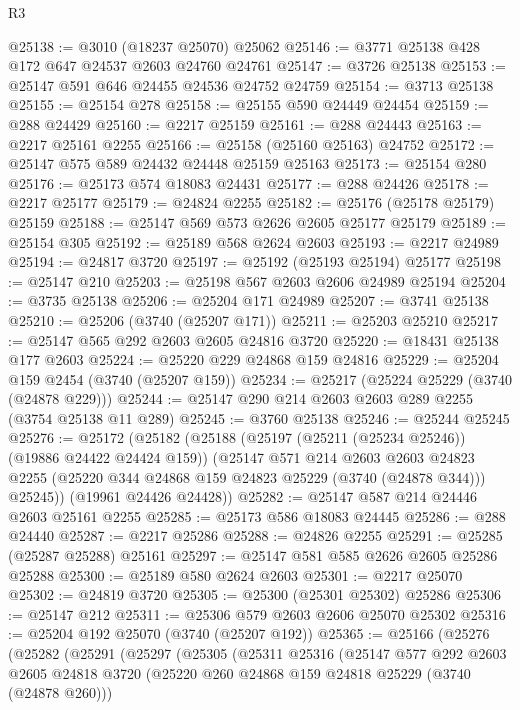 \begin{lexlean}{R3}
\begin{coremodule}
@25138 := @3010 (@18237 @25070) @25062
@25146 := @3771 @25138 @428 @172 @647 @24537 @2603 @24760 @24761
@25147 := @3726 @25138
@25153 := @25147 @591 @646 @24455 @24536 @24752 @24759
@25154 := @3713 @25138
@25155 := @25154 @278
@25158 := @25155 @590 @24449 @24454
@25159 := @288 @24429
@25160 := @2217 @25159
@25161 := @288 @24443
@25163 := @2217 @25161 @2255
@25166 := @25158 (@25160 @25163) @24752
@25172 := @25147 @575 @589 @24432 @24448 @25159 @25163
@25173 := @25154 @280
@25176 := @25173 @574 @18083 @24431
@25177 := @288 @24426
@25178 := @2217 @25177
@25179 := @24824 @2255
@25182 := @25176 (@25178 @25179) @25159
@25188 := @25147 @569 @573 @2626 @2605 @25177 @25179
@25189 := @25154 @305
@25192 := @25189 @568 @2624 @2603
@25193 := @2217 @24989
@25194 := @24817 @3720
@25197 := @25192 (@25193 @25194) @25177
@25198 := @25147 @210
@25203 := @25198 @567 @2603 @2606 @24989 @25194
@25204 := @3735 @25138
@25206 := @25204 @171 @24989
@25207 := @3741 @25138
@25210 := @25206 (@3740 (@25207 @171))
@25211 := @25203 @25210
@25217 := @25147 @565 @292 @2603 @2605 @24816 @3720
@25220 := @18431 @25138 @177 @2603
@25224 := @25220 @229 @24868 @159 @24816
@25229 := @25204 @159 @2454 (@3740 (@25207 @159))
@25234 := @25217 (@25224 @25229 (@3740 (@24878 @229)))
@25244 := @25147 @290 @214 @2603 @2603 @289 @2255 (@3754 @25138 @11 @289)
@25245 := @3760 @25138
@25246 := @25244 @25245
@25276 := @25172
    (@25182
      (@25188
        (@25197 (@25211 (@25234 @25246)) (@19886 @24422 @24424 @159))
        (@25147
          @571
          @214
          @2603
          @2603
          @24823
          @2255
          (@25220 @344 @24868 @159 @24823 @25229 (@3740 (@24878 @344)))
          @25245))
      (@19961 @24426 @24428))
@25282 := @25147 @587 @214 @24446 @2603 @25161 @2255
@25285 := @25173 @586 @18083 @24445
@25286 := @288 @24440
@25287 := @2217 @25286
@25288 := @24826 @2255
@25291 := @25285 (@25287 @25288) @25161
@25297 := @25147 @581 @585 @2626 @2605 @25286 @25288
@25300 := @25189 @580 @2624 @2603
@25301 := @2217 @25070
@25302 := @24819 @3720
@25305 := @25300 (@25301 @25302) @25286
@25306 := @25147 @212
@25311 := @25306 @579 @2603 @2606 @25070 @25302
@25316 := @25204 @192 @25070 (@3740 (@25207 @192))
@25365 := @25166
    (@25276
      (@25282
        (@25291
          (@25297
            (@25305
              (@25311
                @25316
                (@25147
                  @577
                  @292
                  @2603
                  @2605
                  @24818
                  @3720
                  (@25220 @260 @24868 @159 @24818 @25229 (@3740 (@24878 @260)))

\end{coremodule}
\end{lexlean}
